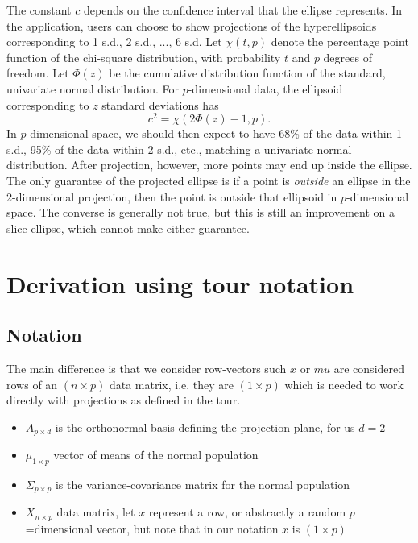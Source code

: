 \documentclass{article}
\begin{document}
The constant $c$ depends on the confidence interval that the ellipse represents. In the application, users can choose to show projections of the hyperellipsoids corresponding to 1 s.d., 2 s.d., ..., 6 s.d. Let $\chi(t, p)$ denote the percentage point function of the chi-square distribution, with probability $t$ and $p$ degrees of freedom. Let $\Phi(z)$ be the cumulative distribution function of the standard, univariate normal distribution. For $p$-dimensional data, the ellipsoid corresponding to $z$ standard deviations has
\begin{equation} \label{ztoc}
c^2 = \chi(2\Phi(z) -1, p).
\end{equation}
In $p$-dimensional space, we should then expect to have 68\% of the data within 1 s.d., 95\% of the data within 2 s.d., etc., matching a univariate normal distribution. After projection, however, more points may end up inside the ellipse. The only guarantee of the projected ellipse is if a point is \emph{outside} an ellipse in the 2-dimensional projection, then the point is outside that ellipsoid in $p$-dimensional space. The converse is generally not true, but this is still an improvement on a slice ellipse, which cannot make either guarantee.

\section{Derivation using tour notation}
\subsection{Notation}

The main difference is that we consider row-vectors such $x$ or $mu$ are considered rows of an $(n\times p)$ data matrix, i.e. they are $(1\times p)$ which is needed to work directly with projections as defined in the tour.

\begin{itemize}
\item $A_{p\times d}$ is the orthonormal basis defining the projection plane, for us $d=2$
\item $\mu_{1\times p}$ vector of means of the normal population
\item $\Sigma_{p\times p}$ is the variance-covariance matrix for the normal population
\item $X_{n\times p}$ data matrix, let $x$ represent a row, or abstractly a random $p$=dimensional vector, but note that in our notation $x$ is $(1\times p)$ 
\end{itemize}
\end{document}
